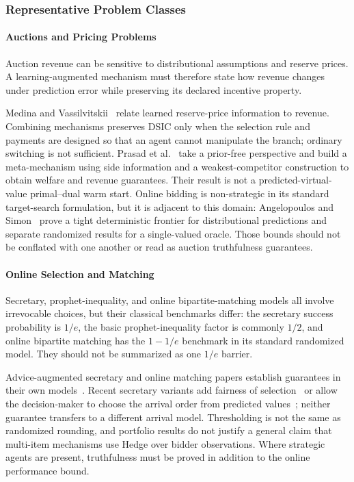 \documentclass[acmsmall,screen,nonacm]{acmart}
\theoremstyle{acmdefinition}%
\begin{document}
\subsubsection{Representative Problem Classes}

\paragraph{Auctions and Pricing Problems}
Auction revenue can be sensitive to distributional assumptions and reserve prices. A learning-augmented mechanism must therefore state how revenue changes under prediction error while preserving its declared incentive property.

Medina and Vassilvitskii~\cite{medina2017revenue} relate learned reserve-price information to revenue. Combining mechanisms preserves DSIC only when the selection rule and payments are designed so that an agent cannot manipulate the branch; ordinary switching is not sufficient. Prasad et al.~\cite{prasad2023sideinfo} take a prior-free perspective and build a meta-mechanism using side information and a weakest-competitor construction to obtain welfare and revenue guarantees. Their result is not a predicted-virtual-value primal--dual warm start. Online bidding is non-strategic in its standard target-search formulation, but it is adjacent to this domain: Angelopoulos and Simon~\cite{angelopoulos2025bidding} prove a tight deterministic frontier for distributional predictions and separate randomized results for a single-valued oracle. Those bounds should not be conflated with one another or read as auction truthfulness guarantees.

\paragraph{Online Selection and Matching}
Secretary, prophet-inequality, and online bipartite-matching models all involve irrevocable choices, but their classical benchmarks differ: the secretary success probability is $1/e$, the basic prophet-inequality factor is commonly $1/2$, and online bipartite matching has the $1-1/e$ benchmark in its standard randomized model. They should not be summarized as one $1/e$ barrier.

Advice-augmented secretary and online matching papers establish guarantees in their own models~\cite{dutting2021secretaries,jin2022bipartite}. Recent secretary variants add fairness of selection~\cite{balkanski2024fair} or allow the decision-maker to choose the arrival order from predicted values~\cite{karisani2026secretary}; neither guarantee transfers to a different arrival model. Thresholding is not the same as randomized rounding, and portfolio results do not justify a general claim that multi-item mechanisms use Hedge over bidder observations. Where strategic agents are present, truthfulness must be proved in addition to the online performance bound.
\end{document}
